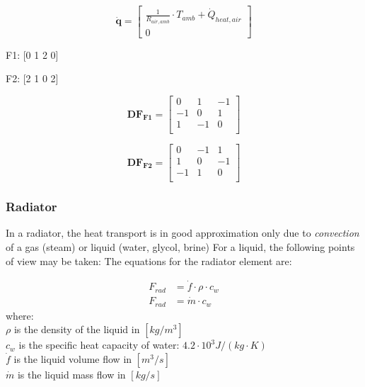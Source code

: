 \begin{equation}
	\mathbf{\dot{q}} =
	\begin{bmatrix}
		\frac{1}{R_{air, amb}} \cdot T_{amb} + \dot{Q}_{heat, air} \\
		0
	\end{bmatrix}
\end{equation}


F1: [0 1 2 0]

F2: [2 1 0 2]

\begin{equation}
	\mathbf{DF_{F1}} = 
	\begin{bmatrix}
		0 & 1 &-1  \\
	   -1 & 0 & 1  \\
		1 &-1 & 0  \\
	\end{bmatrix}
	\label{eq:DFflow1}
\end{equation}

\begin{equation}
	\mathbf{DF_{F2}} = 
	\begin{bmatrix}
		0 &-1 & 1  \\
	    1 & 0 &-1  \\
	   -1 & 1 & 0  \\
	\end{bmatrix}
	\label{eq:DFflow1}
\end{equation}

\subsubsection{Radiator}

In a radiator, the heat transport is in good approximation only due to \emph{convection} of a gas (steam) or liquid (water, glycol, brine) For a liquid, the following points of view may be taken:
The equations for the radiator element are:

{\color{blue}
	\begin{equation}
		\label{eq:radnonlin}
		\begin{aligned}
			F_{rad} &= \dot{f} \cdot \rho \cdot c_w  \\
			F_{rad} &= \dot{m} \cdot c_w  
		\end{aligned}
	\end{equation}
}
where: \\
$\rho$ is the density of the liquid in $[kg/m^3]$ \\
$c_w$ is the specific heat capacity of water: $4.2 \cdot 10^3 J/(kg \cdot K)$ \\
$\dot{f}$ is the liquid volume flow in $[m^3/s]$ \\
$\dot{m}$ is the liquid mass flow in $[kg/s]$ \\

